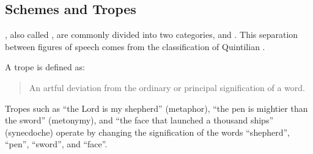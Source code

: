 \subsection{Schemes and Tropes}
, also called , are commonly divided into two categories,   and . This separation between figures of speech comes from the classification of Quintilian \cite[p.196]{fahnestock1999}. 

A trope is defined as:
\begin{quotation}
An artful deviation from the ordinary or principal signification of a word. \\\citep{Burton1996}%
\end{quotation}
\noindent
Tropes such as “the Lord is my shepherd” (metaphor), “the pen is mightier than the sword” (metonymy), and “the face that launched a thousand ships” (synecdoche) operate by changing the signification of the words ``shepherd'', ``pen'', ``sword'', and ``face''. %


